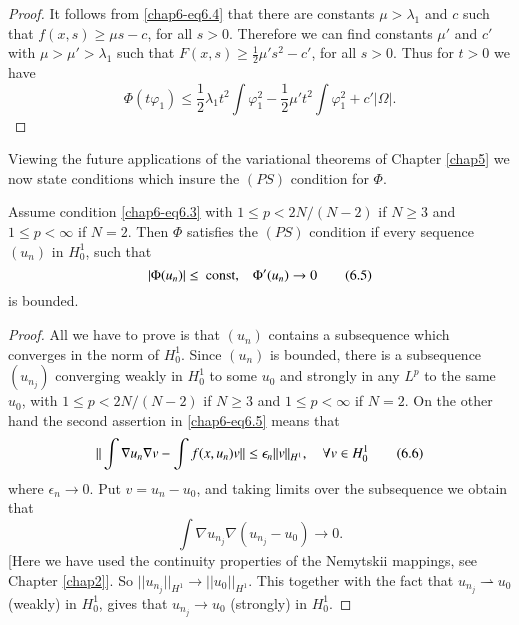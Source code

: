 \begin{proof}
It follows from \eqref{chap6-eq6.4} that there are constants
$\mu>\lambda_{1}$ and $c$ such that $f(x,s)\geq \mu s-c$, for all
$s>0$. Therefore we can find constants $\mu'$ and $c'$ with
$\mu>\mu'>\lambda_{1}$ such that $F(x,s)\geq \frac{1}{2}\mu's^{2}-c'$,
for all $s>0$. Thus for $t>0$ we have
$$
\Phi(t\varphi_{1})\leq \frac{1}{2}\lambda_{1}t^{2}\int
\varphi^{2}_{1}-\frac{1}{2}\mu't^{2}\int\varphi^{2}_{1}+c'|\Omega|. 
$$
\end{proof}

Viewing the future applications of the variational theorems of Chapter
\ref{chap5} we now state conditions which insure the $(PS)$ condition
for $\Phi$.

\begin{lemma}\label{chap6-lem6.2}
Assume condition \eqref{chap6-eq6.3} with $1\leq p<2N/(N-2)$ if $N\geq
3$ and $1\leq p<\infty$ if $N=2$. Then $\Phi$ satisfies the $(PS)$
condition if every sequence $(u_{n})$ in $H^{1}_{0}$, such that
\begin{equation*}
|\Phi(u_{n})|\leq \text{~const,}\quad \Phi'(u_{n})\to
0\tag{6.5}\label{chap6-eq6.5} 
\end{equation*}
is bounded.
\end{lemma}

\begin{proof}
All we have to prove is that $(u_{n})$ contains a subsequence which
converges in the norm of $H^{1}_{0}$. Since $(u_{n})$ is bounded,
there is a subsequence $(u_{n_{j}})$ converging weakly in $H^{1}_{0}$
to some $u_{0}$ and strongly in any $L^{p}$ to the same $u_{0}$, with
$1\leq p<2N/(N-2)$ if $N\geq 3$ and $1\leq p<\infty$ if $N=2$. On the
other hand the second assertion in \eqref{chap6-eq6.5} means that
\begin{equation*}
||\int \nabla u_{n}\nabla v-\int f(x,u_{n})v||\leq
\epsilon_{n}||v||_{H^{1}},\quad \forall v\in
H^{1}_{0}\tag{6.6}\label{chap6-eq6.6}  
\end{equation*}
where $\epsilon_{n}\to 0$. Put $v=u_{n}-u_{0}$, and taking limits over
the subsequence we obtain that
$$
\int \nabla u_{n_{j}}\nabla (u_{n_{j}}-u_{0})\to 0.
$$
[Here we have used the continuity properties of the Nemytskii
  mappings, see Chapter \ref{chap2}]. So $||u_{n_{j}}||_{H^{1}}\to
||u_{0}||_{H^{1}}$. This together with the fact that
$u_{n_{j}}\rightharpoonup u_{0}$\pageoriginale (weakly) in $H^{1}_{0}$, gives that
$u_{n_{j}}\to u_{0}$ (strongly) in $H^{1}_{0}$. 
\end{proof}

